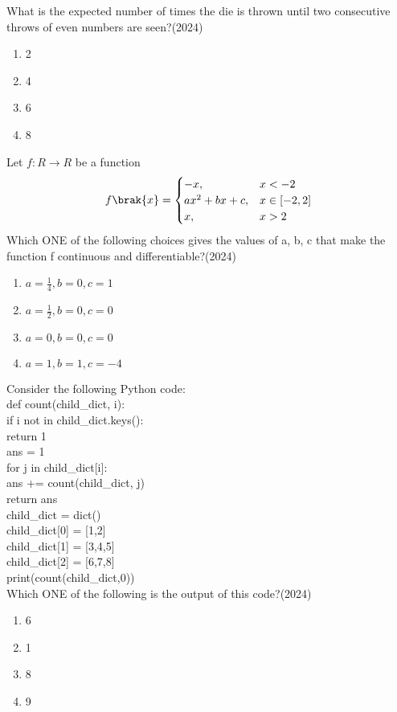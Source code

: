     What is the expected number of times the die is thrown until two consecutive throws
    of even numbers are seen?\hfill (2024)
    \begin{enumerate}[label = (\Alph*)]
        \item 2
        \item 4
        \item 6
        \item 8
    \end{enumerate}
    \item Let $f: R\to R$ be a function $$f\brak{x} = \begin{cases} -x, & x<-2\\ax^2 + bx + c, &x\in [-2,2]\\ x,& x>2\end{cases}$$ 
    Which ONE of the following choices gives the values of a, b, c that make the
    function f continuous and differentiable?\hfill (2024)
    \begin{enumerate}[label = (\Alph*)]
        \item $a=\frac{1}{4}, b = 0, c=1$
        \item $a=\frac{1}{2}, b = 0, c=0$
        \item $a=0, b = 0, c=0$
        \item $a=1, b = 1, c=-4$
    \end{enumerate}
    \item Consider the following Python code:\\
    def count(child\_dict, i):\\
     if i not in child\_dict.keys():\\
     return 1\\
     ans = 1\\
     for j in child\_dict[i]:\\
     ans += count(child\_dict, j)\\
     return ans\\
    child\_dict = dict()\\
    child\_dict[0] = [1,2]\\
    child\_dict[1] = [3,4,5]\\
    child\_dict[2] = [6,7,8]\\
    print(count(child\_dict,0))\\
    Which ONE of the following is the output of this code?\hfill (2024)
    \begin{enumerate}[label = (\Alph*)]
        \item 6
        \item 1
        \item 8
        \item 9 
    \end{enumerate}
